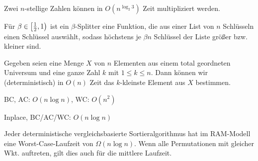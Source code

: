 \documentclass{cheat-sheet}
\begin{document}
\iffalse
  \begin{satz}
    Seien $\beta, c, k, n$ reelle Zahlen mit $c, k > 0$, $n \in \N_0$ und $0 < \beta < 1$ und sei $T : \N_0 \to \R_{\geq 0}$ eine Funktion, die folgende Rekursionsungleichung erfüllt:
    \[ T(n) \leq \begin{cases}
      c, & \text{ für } n \leq N \\
      c n^k + T(\lfloor \beta n \rfloor), & \text{ für } n > N.
    \end{cases} \]
    Dann ist $T(n) = O(n^k)$
  \end{satz}
\fi


\begin{satz}
  Zwei $n$-stellige Zahlen können in $O(n^{\log_2 3})$ Zeit multipliziert werden.
\end{satz}


\begin{defn}
  Für $\beta \in \left[ \tfrac{1}{2}, 1 \right)$ ist ein $\beta$-Splitter eine Funktion, die aus einer List von $n$ Schlüsseln einen Schlüssel auswählt, sodass höchstens je $\beta n$ Schlüssel der Liste größer bzw. kleiner sind.
\end{defn}

\begin{satz}[Selektion]
  Gegeben seien eine Menge $X$ von $n$ Elementen aus einem total geordneten Universum und eine ganze Zahl $k$ mit $1 \leq k \leq n$. Dann können wir (deterministisch) in $O(n)$ Zeit das $k$-kleinste Element aus $X$ bestimmen.
\end{satz}


\begin{alg}[Quicksort]
  BC, AC: $O(n \log n)$, WC: $O(n^2)$
\end{alg}


\begin{alg}[Heapsort]
  Inplace, BC/AC/WC: $O(n \log n)$
\end{alg}


\begin{satz}
  Jeder deterministische vergleichsbasierte Sortieralgorithmus hat im RAM-Modell eine Worst-Case-Laufzeit von $\Omega(n \log n)$. Wenn alle Permutationen mit gleicher Wkt. auftreten, gilt dies auch für die mittlere Laufzeit.
\end{satz}
\end{document}
